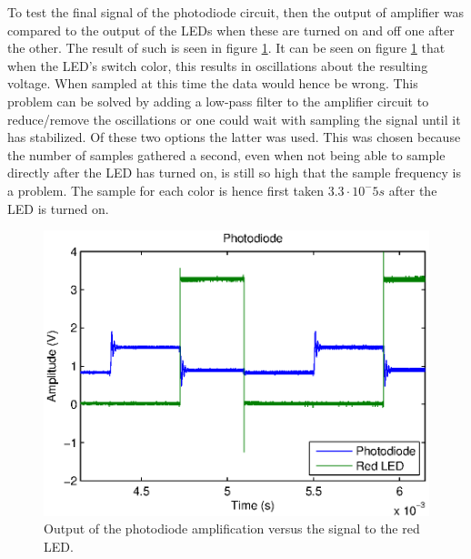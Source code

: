 To test the final signal of the photodiode circuit, then the output of amplifier was compared to the output of the LEDs when these are turned on and off one after the other.
The result of such is seen in figure \ref{fig:photodiode_output}.
It can be seen on figure \ref{fig:photodiode_output} that when the LED's switch color, this results in oscillations about the resulting voltage.
When sampled at this time the data would hence be wrong.
This problem can be solved by adding a low-pass filter to the amplifier circuit to reduce/remove the oscillations or one could wait with sampling the signal until it has stabilized.
Of these two options the latter was used.
This was chosen because the number of samples gathered a second, even when not being able to sample directly after the LED has turned on, is still so high that the sample frequency is a problem.
The sample for each color is hence first taken $3.3 \cdot 10^-5 s$ after the LED is turned on.


\begin{figure}[H]
\centering 
\includegraphics[width = 0.9 \textwidth]{images/photodiode}
\caption{Output of the photodiode amplification versus the signal to the red LED.}
\label{fig:photodiode_output}
\end{figure}






